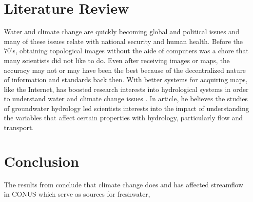 \documentclass[a4paper,man,biblatex]{apa7}
\begin{document}
\section{Literature Review} Water and climate change are quickly becoming global and political issues and many of these issues relate with national security and human health. Before the 70's, obtaining topological images without the aide of computers was a chore that many scientists did not like to do. Even after receiving images or maps, the accuracy may not or may have been the best because of the decentralized nature of information and standards back then. With better systems for acquiring maps, like the Internet, has boosted research interests into hydrological systems in order to understand water and climate change issues \autocite{bras_1999}. In \textcite{bras_1999} article, he believes the studies of groundwater hydrology led scientists interests into the impact of understanding the variables that affect certain properties with hydrology, particularly flow and transport.

\section{Conclusion} The results from \textcite{rice_2016} conclude that climate change does and has affected streamflow in CONUS which serve as sources for freshwater,


\printbibliography
\end{document}
